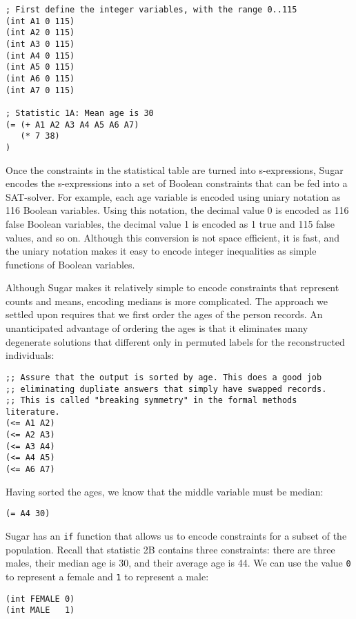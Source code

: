 \documentclass[runningheads]{llncs}
\begin{document}
\begin{Verbatim}
; First define the integer variables, with the range 0..115
(int A1 0 115)
(int A2 0 115)
(int A3 0 115)
(int A4 0 115)
(int A5 0 115)
(int A6 0 115)
(int A7 0 115)

; Statistic 1A: Mean age is 30
(= (+ A1 A2 A3 A4 A5 A6 A7)
   (* 7 38)
)
\end{Verbatim}
Once the constraints in the statistical table are turned into
s-expressions, Sugar encodes the s-expressions into a
set of Boolean constraints that can be fed into a SAT-solver. For example, each age variable
is encoded using uniary notation as 116 Boolean variables. Using this
notation, the decimal value 0 is encoded as 116 false Boolean
variables, the decimal value 1 is encoded as 1 true and 115 false
values, and so on. Although this
conversion is not space efficient, it is fast, and the uniary notation makes
it easy to encode integer inequalities as simple functions of Boolean
variables. 

Although Sugar makes it relatively simple to encode constraints that
represent counts and means, encoding medians is more complicated. The
approach we settled upon requires that we first order the ages of the
person records. An unanticipated advantage of ordering the ages is
that it eliminates many degenerate solutions that different only in
permuted labels for the reconstructed individuals:

\begin{Verbatim}
;; Assure that the output is sorted by age. This does a good job 
;; eliminating dupliate answers that simply have swapped records.
;; This is called "breaking symmetry" in the formal methods literature. 
(<= A1 A2)
(<= A2 A3)
(<= A3 A4)
(<= A4 A5)
(<= A6 A7)
\end{Verbatim}

Having sorted the ages, we know that the middle variable must
be median:

\begin{Verbatim}
(= A4 30)
\end{Verbatim}

Sugar has an \texttt{if} function that allows us to encode constraints
for a subset of the population. Recall that statistic 2B contains three
constraints: there are three males, their median age is 30, and their
average age is 44. We can use the value \texttt{0} to represent a female
and \texttt{1} to represent a male:

\begin{Verbatim}
(int FEMALE 0)
(int MALE   1)
\end{Verbatim} 
\end{document}
